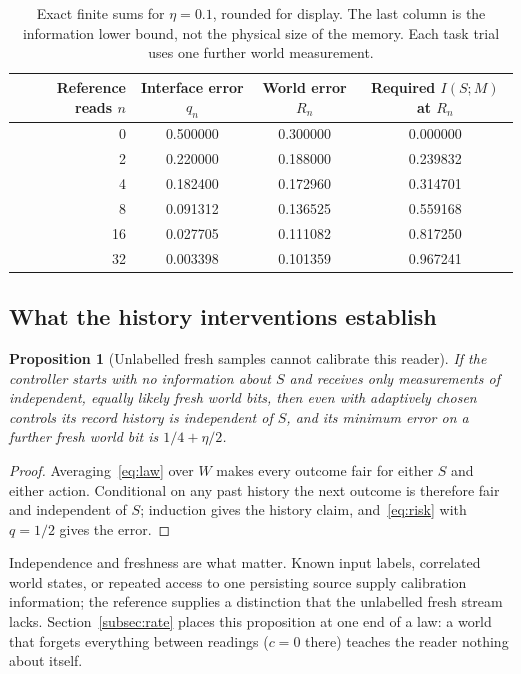 \documentclass[11pt,a4paper]{article}
\newtheorem{proposition}[definition]{Proposition}
\begin{document}
\begin{table}[ht]
\centering
\begin{tabular}{rccc}
\toprule
Reference reads $n$ & Interface error $q_n$ & World error $R_n$ & Required $I(S;M)$ at $R_n$\\
\midrule
0 & 0.500000 & 0.300000 & 0.000000\\
2 & 0.220000 & 0.188000 & 0.239832\\
4 & 0.182400 & 0.172960 & 0.314701\\
8 & 0.091312 & 0.136525 & 0.559168\\
16 & 0.027705 & 0.111082 & 0.817250\\
32 & 0.003398 & 0.101359 & 0.967241\\
\bottomrule
\end{tabular}
\caption{Exact finite sums for $\eta=0.1$, rounded for display. The last column is the information lower bound, not the physical size of the memory. Each task trial uses one further world measurement.}
\label{tab:fixed}
\end{table}

\subsection{What the history interventions establish}

\begin{proposition}[Unlabelled fresh samples cannot calibrate this reader]\label{prop:no_reference}
If the controller starts with no information about $S$ and receives only measurements of independent, equally likely fresh world bits, then even with adaptively chosen controls its record history is independent of $S$, and its minimum error on a further fresh world bit is $1/4+\eta/2$.
\end{proposition}
\begin{proof}
Averaging~\eqref{eq:law} over $W$ makes every outcome fair for either $S$ and either action. Conditional on any past history the next outcome is therefore fair and independent of $S$; induction gives the history claim, and~\eqref{eq:risk} with $q=1/2$ gives the error.
\end{proof}

Independence and freshness are what matter. Known input labels, correlated world states, or repeated access to one persisting source supply calibration information; the reference supplies a distinction that the unlabelled fresh stream lacks. Section~\ref{subsec:rate} places this proposition at one end of a law: a world that forgets everything between readings ($c=0$ there) teaches the reader nothing about itself.
\end{document}
